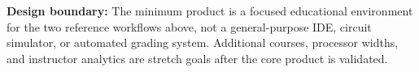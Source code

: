 \documentclass[10pt,letterpaper]{article}
\begin{document}
\vfill
\noindent\colorbox{SoftBlue}{\parbox{\dimexpr\linewidth-2\fboxsep\relax}{\small\textbf{Design boundary:} The minimum product is a focused educational environment for the two reference workflows above, not a general-purpose IDE, circuit simulator, or automated grading system. Additional courses, processor widths, and instructor analytics are stretch goals after the core product is validated.}}
\end{document}
